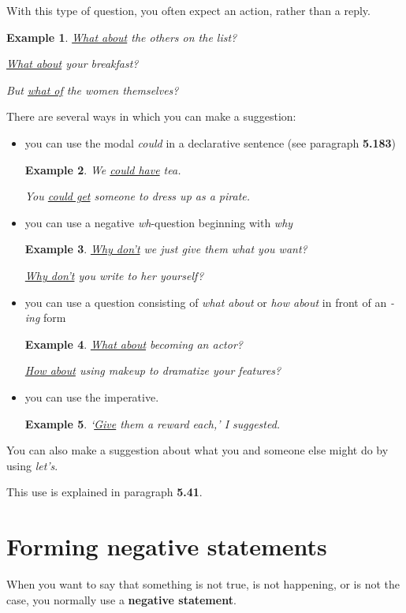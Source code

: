 \documentclass[oneside]{book}
\numberwithin{equation}{section}
\newtheorem{example}{Example}[section]
\begin{document}
%
With this type of question, you often expect an action, rather than a reply.
\begin{example}
    \underline{What about} the others on the list?
    
    \underline{What about} your breakfast?
    
    But \underline{what of} the women themselves?
\end{example}
%
\noindent{} There are several ways in which you can make a suggestion:
\begin{itemize}
    \item you can use the modal \textit{could} in a declarative sentence (see paragraph \textbf{5.183})
    \begin{example}
        We \underline{could have} tea.
        
        You \underline{could get} someone to dress up as a pirate.
    \end{example}
    \item you can use a negative \textit{wh}-question beginning with \textit{why}
    \begin{example}
        \underline{Why don't} we just give them what you want?
        
        \underline{Why don't} you write to her yourself?
    \end{example}
    \item you can use a question consisting of \textit{what about} or \textit{how about} in front of an \textit{-ing} form
    \begin{example}
        \underline{What about} becoming an actor?
        
        \underline{How about} using makeup to dramatize your features?
    \end{example}
    \item you can use the imperative.
    \begin{example}
        `\underline{Give} them a reward each,' I suggested.
    \end{example}
\end{itemize}
You can also make a suggestion about what you and someone else might do by using \textit{let's}.

This use is explained in paragraph \textbf{5.41}.

\section{Forming negative statements}
\noindent{} When you want to say that something is not true, is not happening, or is not the case, you normally use a \textbf{negative statement}.
\end{document}
